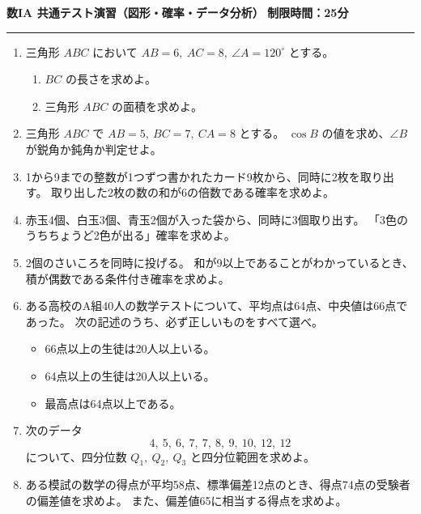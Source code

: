 \documentclass[lualatex,ja=standard]{bxjsarticle}
\begin{document}
\noindent\textbf{数IA 共通テスト演習（図形・確率・データ分析）}
\hfill\textbf{制限時間：25分}
\hrule
\vspace{0.8em}

\begin{enumerate}
\item 三角形 $ABC$ において $AB=6,\ AC=8,\ \angle A=120^\circ$ とする。
\begin{enumerate}[label=(\arabic*)]
\item $BC$ の長さを求めよ。
\item 三角形 $ABC$ の面積を求めよ。
\end{enumerate}

\item 三角形 $ABC$ で $AB=5,\ BC=7,\ CA=8$ とする。
$\cos B$ の値を求め、$\angle B$ が鋭角か鈍角か判定せよ。

\item 1から9までの整数が1つずつ書かれたカード9枚から、同時に2枚を取り出す。
取り出した2枚の数の和が6の倍数である確率を求めよ。

\item 赤玉4個、白玉3個、青玉2個が入った袋から、同時に3個取り出す。
「3色のうちちょうど2色が出る」確率を求めよ。

\item 2個のさいころを同時に投げる。
和が9以上であることがわかっているとき、積が偶数である条件付き確率を求めよ。

\item ある高校のA組40人の数学テストについて、平均点は64点、中央値は66点であった。
次の記述のうち、必ず正しいものをすべて選べ。
\begin{itemize}
\item[(ア)] 66点以上の生徒は20人以上いる。
\item[(イ)] 64点以上の生徒は20人以上いる。
\item[(ウ)] 最高点は64点以上である。
\end{itemize}

\item 次のデータ
\[
4,\ 5,\ 6,\ 7,\ 7,\ 8,\ 9,\ 10,\ 12,\ 12
\]
について、四分位数 $Q_1,\ Q_2,\ Q_3$ と四分位範囲を求めよ。

\item ある模試の数学の得点が平均58点、標準偏差12点のとき、得点74点の受験者の偏差値を求めよ。
また、偏差値65に相当する得点を求めよ。
\end{enumerate}
\end{document}
